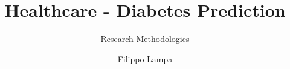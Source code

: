 \documentclass{unicam_thesis}
\title{Healthcare - Diabetes Prediction}
\subtitle{Research Methodologies}
\author{Filippo Lampa}%
\begin{document}
\maketitle



\tableofcontents
\lstlistoflistings
\listoffigures
\listoftables




%
%
%

\printbibliography


%
\end{document}
